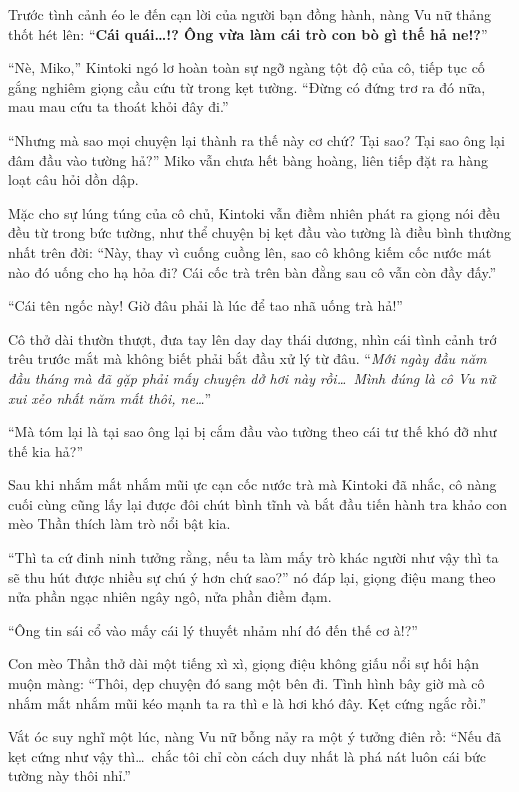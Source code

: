 \documentclass[../main.tex]{subfiles}
\begin{document}
Trước tình cảnh éo le đến cạn lời của người bạn đồng hành, nàng Vu nữ thảng thốt hét lên: ``\textbf{Cái quái\dots!? Ông vừa làm cái trò con bò gì thế hả ne!?}''

``Nè, Miko,'' Kintoki ngó lơ hoàn toàn sự ngỡ ngàng tột độ của cô, tiếp tục cố gắng nghiêm giọng cầu cứu từ trong kẹt tường. ``Đừng có đứng trơ ra đó nữa, mau mau cứu ta thoát khỏi đây đi.''

``Nhưng mà sao mọi chuyện lại thành ra thế này cơ chứ? Tại sao? Tại sao ông lại đâm đầu vào tường hả?'' Miko vẫn chưa hết bàng hoàng, liên tiếp đặt ra hàng loạt câu hỏi dồn dập.

Mặc cho sự lúng túng của cô chủ, Kintoki vẫn điềm nhiên phát ra giọng nói đều đều từ trong bức tường, như thể chuyện bị kẹt đầu vào tường là điều bình thường nhất trên đời: ``Này, thay vì cuống cuồng lên, sao cô không kiếm cốc nước mát nào đó uống cho hạ hỏa đi? Cái cốc trà trên bàn đằng sau cô vẫn còn đầy đấy.''

``Cái tên ngốc này! Giờ đâu phải là lúc để tao nhã uống trà hả!''

Cô thở dài thườn thượt, đưa tay lên day day thái dương, nhìn cái tình cảnh trớ trêu trước mắt mà không biết phải bắt đầu xử lý từ đâu. ``\textit{Mới ngày đầu năm đầu tháng mà đã gặp phải mấy chuyện dở hơi này rồi\dots\ Mình đúng là cô Vu nữ xui xẻo nhất năm mất thôi, ne\dots}''

\ct

``Mà tóm lại là tại sao ông lại bị cắm đầu vào tường theo cái tư thế khó đỡ như thế kia hả?''

Sau khi nhắm mắt nhắm mũi ực cạn cốc nước trà mà Kintoki đã nhắc, cô nàng cuối cùng cũng lấy lại được đôi chút bình tĩnh và bắt đầu tiến hành tra khảo con mèo Thần thích làm trò nổi bật kia.

``Thì ta cứ đinh ninh tưởng rằng, nếu ta làm mấy trò khác người như vậy thì ta sẽ thu hút được nhiều sự chú ý hơn chứ sao?'' nó đáp lại, giọng điệu mang theo nửa phần ngạc nhiên ngây ngô, nửa phần điềm đạm.

``Ông tin sái cổ vào mấy cái lý thuyết nhảm nhí đó đến thế cơ à!?''

Con mèo Thần thở dài một tiếng xì xì, giọng điệu không giấu nổi sự hối hận muộn màng: ``Thôi, dẹp chuyện đó sang một bên đi. Tình hình bây giờ mà cô nhắm mắt nhắm mũi kéo mạnh ta ra thì e là hơi khó đây. Kẹt cứng ngắc rồi.''

Vắt óc suy nghĩ một lúc, nàng Vu nữ bỗng nảy ra một ý tưởng điên rồ: ``Nếu đã kẹt cứng như vậy thì\dots\ chắc tôi chỉ còn cách duy nhất là phá nát luôn cái bức tường này thôi nhỉ.''
\end{document}
